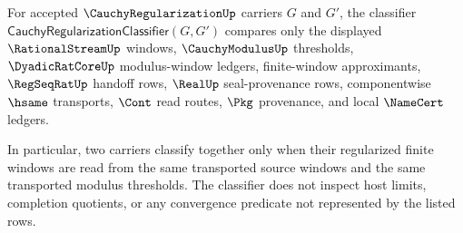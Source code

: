 \begin{definition}
\label{def:cauchyregularization-modulus-classifier}
For accepted $\CauchyRegularizationUp$ carriers $G$ and $G'$, the classifier
$\mathsf{CauchyRegularizationClassifier}(G,G')$ compares only the displayed
$\RationalStreamUp$ windows, $\CauchyModulusUp$ thresholds,
$\DyadicRatCoreUp$ modulus-window ledgers, finite-window approximants,
$\RegSeqRatUp$ handoff rows, $\RealUp$ seal-provenance rows, componentwise
$\hsame$ transports, $\Cont$ read routes, $\Pkg$ provenance, and local
$\NameCert$ ledgers.

In particular, two carriers classify together only when their regularized
finite windows are read from the same transported source windows and the same
transported modulus thresholds. The classifier does not inspect host limits,
completion quotients, or any convergence predicate not represented by the
listed rows.
\end{definition}

